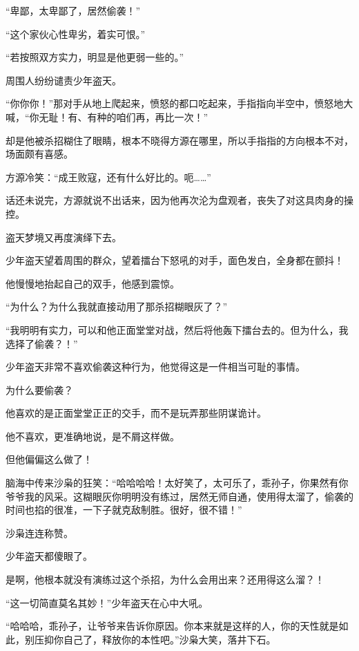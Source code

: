 
\begin{this_body}



“卑鄙，太卑鄙了，居然偷袭！”

“这个家伙心性卑劣，着实可恨。”

“若按照双方实力，明显是他更弱一些的。”

周围人纷纷谴责少年盗天。

“你你你！”那对手从地上爬起来，愤怒的都口吃起来，手指指向半空中，愤怒地大喊，“你无耻！有、有种的咱们再，再比一次！”

却是他被杀招糊住了眼睛，根本不晓得方源在哪里，所以手指指的方向根本不对，场面颇有喜感。

方源冷笑：“成王败寇，还有什么好比的。呃……”

话还未说完，方源就说不出话来，因为他再次沦为盘观者，丧失了对这具肉身的操控。

盗天梦境又再度演绎下去。

少年盗天望着周围的群众，望着擂台下怒吼的对手，面色发白，全身都在颤抖！

他慢慢地抬起自己的双手，他感到震惊。

“为什么？为什么我就直接动用了那杀招糊眼灰了？”

“我明明有实力，可以和他正面堂堂对战，然后将他轰下擂台去的。但为什么，我选择了偷袭？！”

少年盗天非常不喜欢偷袭这种行为，他觉得这是一件相当可耻的事情。

为什么要偷袭？

他喜欢的是正面堂堂正正的交手，而不是玩弄那些阴谋诡计。

他不喜欢，更准确地说，是不屑这样做。

但他偏偏这么做了！

脑海中传来沙枭的狂笑：“哈哈哈哈！太好笑了，太可乐了，乖孙子，你果然有你爷爷我的风采。这糊眼灰你明明没有练过，居然无师自通，使用得太溜了，偷袭的时间也掐的很准，一下子就克敌制胜。很好，很不错！”

沙枭连连称赞。

少年盗天都傻眼了。

是啊，他根本就没有演练过这个杀招，为什么会用出来？还用得这么溜？！

“这一切简直莫名其妙！”少年盗天在心中大吼。

“哈哈哈，乖孙子，让爷爷来告诉你原因。你本来就是这样的人，你的天性就是如此，别压抑你自己了，释放你的本性吧。”沙枭大笑，落井下石。


\end{this_body}
